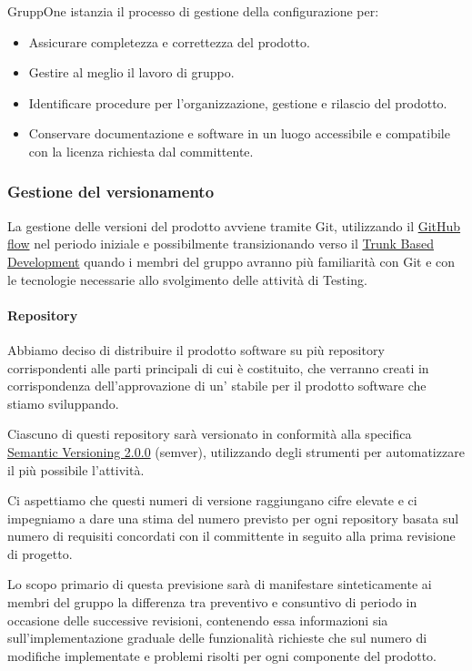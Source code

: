 \documentclass[../norme-di-progetto.tex]{subfiles}
\begin{document}
GruppOne istanzia il processo di gestione della configurazione per:
\begin{itemize}
  \item Assicurare completezza e correttezza del prodotto.
  \item Gestire al meglio il lavoro di gruppo.
  \item Identificare procedure per l'organizzazione, gestione e rilascio del prodotto.
  \item Conservare documentazione e software in un luogo accessibile e compatibile con la licenza richiesta dal committente.
\end{itemize}

\subsubsection{Gestione del versionamento}%
\label{subs:gestione_del_versionamento}

La gestione delle versioni del prodotto avviene tramite Git, utilizzando il \href{https://help.github.com/en/github/collaborating-with-issues-and-pull-requests/github-flow}{GitHub flow} nel periodo iniziale e possibilmente transizionando verso il \href{https://trunkbaseddevelopment.com/}{Trunk Based Development} quando i membri del gruppo avranno più familiarità con Git e con le tecnologie necessarie allo svolgimento delle attività di Testing.

\paragraph{Repository}%
\label{par:repository}

Abbiamo deciso di distribuire il prodotto software su più repository corrispondenti alle parti principali di cui è costituito, che verranno creati in corrispondenza dell'approvazione di un' stabile per il prodotto software che stiamo sviluppando.

Ciascuno di questi repository sarà versionato in conformità alla specifica \href{https://semver.org/spec/v2.0.0.html}{Semantic Versioning 2.0.0} (semver), utilizzando degli strumenti per automatizzare il più possibile l'attività.

Ci aspettiamo che questi numeri di versione raggiungano cifre elevate e ci impegniamo a dare una stima del numero previsto per ogni repository basata sul numero di requisiti concordati con il committente in seguito alla prima revisione di progetto.

Lo scopo primario di questa previsione sarà di manifestare sinteticamente ai membri del gruppo la differenza tra preventivo e consuntivo di periodo in occasione delle successive revisioni, contenendo essa informazioni sia sull'implementazione graduale delle funzionalità richieste che sul numero di modifiche implementate e problemi risolti per ogni componente del prodotto.
\end{document}
